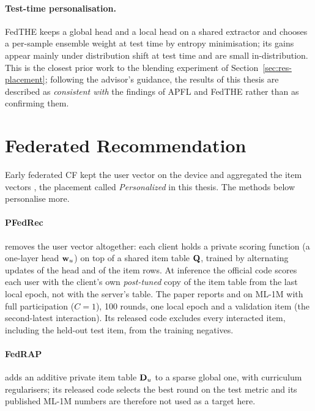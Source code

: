 \paragraph{Test-time personalisation.} FedTHE \cite{jiang2023fedthe} keeps a global head and a
local head on a shared extractor and chooses a per-sample ensemble weight at test time by
entropy minimisation; its gains appear mainly under distribution shift at test time and are
small in-distribution. This is the closest prior work to the blending experiment of
Section~\ref{sec:res-placement}; following the advisor's guidance, the results of this thesis are
described as \emph{consistent with} the findings of APFL and FedTHE rather than as confirming
them.

\section{Federated Recommendation}
\label{sec:lit-fedrec}

Early federated CF kept the user vector on the device and aggregated the item vectors
\cite{ammaduddin2019fcf,chai2021fedmf}, the placement called \emph{Personalized} in this
thesis. The methods below personalise more.

\paragraph{PFedRec} \cite{zhang2023pfedrec} removes the user vector altogether: each client
holds a private scoring function (a one-layer head $\mathbf{w}_u$) on top of a shared item table
$\mathbf{Q}$, trained by alternating updates of the head and of the item rows. At inference the
official code scores each user with the client's own \emph{post-tuned} copy of the item table
from the last local epoch, not with the server's table. The paper reports
\PublishedPfedrecNdcg{} \ndcg{} and \PublishedPfedrecHr{} \hr{} on ML-1M with full
participation ($C=1$), 100 rounds, one local epoch and a validation item (the second-latest
interaction). Its released code excludes every interacted item, including the held-out test
item, from the training negatives.

\paragraph{FedRAP} \cite{li2024fedrap} adds an additive private item table $\mathbf{D}_u$ to a
sparse global one, with curriculum regularisers; its released code selects the best round on the
test metric and its published ML-1M numbers are therefore not used as a target here.
